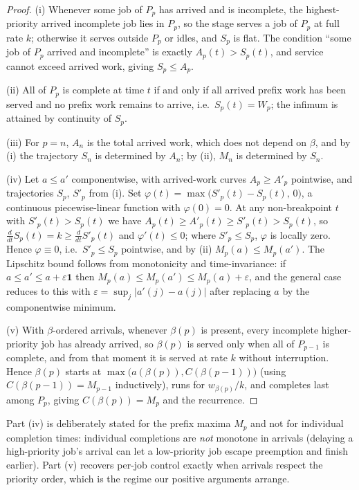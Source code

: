\documentclass[sn-mathphys,NameDate]{sn-jnl}
\theoremstyle{thmstyleone}
\theoremstyle{thmstylethree}
\theoremstyle{thmstyletwo}
\begin{document}
\begin{proof}
(i) Whenever some job of $P_p$ has arrived and is incomplete,
the highest-priority arrived incomplete job lies in $P_p$, so
the stage serves a job of $P_p$ at full rate $k$; otherwise it
serves outside $P_p$ or idles, and $S_p$ is flat. The
condition ``some job of $P_p$ arrived and incomplete'' is
exactly $A_p(t) > S_p(t)$, and service cannot exceed arrived
work, giving $S_p \leq A_p$.

(ii) All of $P_p$ is complete at time $t$ if and only if all
arrived prefix work has been served and no prefix work remains
to arrive, i.e.\ $S_p(t) = W_p$; the infimum is attained by
continuity of $S_p$.

(iii) For $p = n$, $A_n$ is the total arrived work, which does
not depend on $\beta$, and by (i) the trajectory $S_n$ is
determined by $A_n$; by (ii), $M_n$ is determined by $S_n$.

(iv) Let $a \leq a'$ componentwise, with arrived-work curves
$A_p \geq A'_p$ pointwise, and trajectories $S_p$, $S'_p$ from
(i). Set $\varphi(t) = \max\bigl(S'_p(t) - S_p(t),\, 0\bigr)$,
a continuous piecewise-linear function with $\varphi(0) = 0$.
At any non-breakpoint $t$ with $S'_p(t) > S_p(t)$ we have
$A_p(t) \geq A'_p(t) \geq S'_p(t) > S_p(t)$, so
$\frac{d}{dt}S_p(t) = k \geq \frac{d}{dt}S'_p(t)$ and
$\varphi'(t) \leq 0$; where $S'_p \leq S_p$, $\varphi$ is
locally zero. Hence $\varphi \equiv 0$, i.e.\
$S'_p \leq S_p$ pointwise, and by (ii)
$M_p(a) \leq M_p(a')$. The Lipschitz bound follows from
monotonicity and time-invariance: if
$a \leq a' \leq a + \varepsilon\mathbf{1}$ then
$M_p(a) \leq M_p(a') \leq M_p(a) + \varepsilon$, and the
general case reduces to this with
$\varepsilon = \sup_j |a'(j) - a(j)|$ after replacing $a$ by
the componentwise minimum.

(v) With $\beta$-ordered arrivals, whenever $\beta(p)$ is
present, every incomplete higher-priority job has already
arrived, so $\beta(p)$ is served only when all of $P_{p-1}$ is
complete, and from that moment it is served at rate $k$
without interruption. Hence $\beta(p)$ starts at
$\max\bigl(a(\beta(p)), C(\beta(p-1))\bigr)$
(using $C(\beta(p-1)) = M_{p-1}$ inductively), runs for
$w_{\beta(p)}/k$, and completes last among $P_p$, giving
$C(\beta(p)) = M_p$ and the recurrence.
\end{proof}

Part (iv) is deliberately stated for the prefix maxima $M_p$
and not for individual completion times: individual
completions are \emph{not} monotone in arrivals (delaying a
high-priority job's arrival can let a low-priority job escape
preemption and finish earlier). Part (v) recovers per-job
control exactly when arrivals respect the priority order,
which is the regime our positive arguments arrange.
\end{document}

